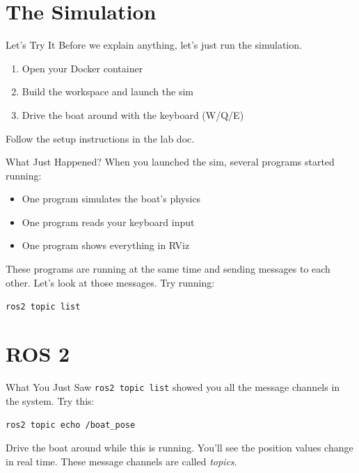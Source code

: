 \documentclass[aspectratio=169]{beamer}
\begin{document}
\section{The Simulation}

\begin{frame}{Let's Try It}
    Before we explain anything, let's just run the simulation.
    \vfill
    \begin{enumerate}
        \item Open your Docker container
        \item Build the workspace and launch the sim
        \item Drive the boat around with the keyboard (W/Q/E)
    \end{enumerate}
    \vfill
    Follow the setup instructions in the lab doc.
    \vfill
\end{frame}

\begin{frame}{What Just Happened?}
    When you launched the sim, several programs started running:
    \vfill
    \begin{itemize}
        \item One program simulates the boat's physics
        \item One program reads your keyboard input
        \item One program shows everything in RViz
    \end{itemize}
    \vfill
    These programs are running at the same time and sending messages to each other.
    \vfill
    Let's look at those messages. Try running:
    \begin{center}
        \texttt{ros2 topic list}
    \end{center}
\end{frame}

\section{ROS 2}

\begin{frame}{What You Just Saw}
    \texttt{ros2 topic list} showed you all the message channels in the system.
    \vfill
    Try this:
    \begin{center}
        \texttt{ros2 topic echo /boat\_pose}
    \end{center}
    \vfill
    Drive the boat around while this is running. You'll see the position values change in real time.
    \vfill
    These message channels are called \textit{topics}.
\end{frame}
\end{document}
